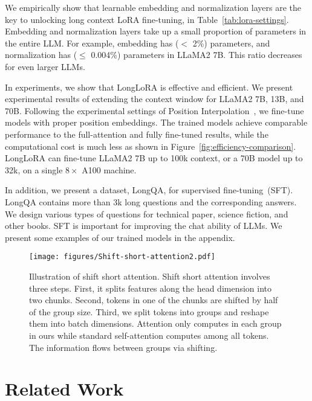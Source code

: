 \documentclass{article} %
\begin{document}
We empirically show that learnable embedding and normalization layers are the key to unlocking long context LoRA fine-tuning, in Table~\ref{tab:lora-settings}. Embedding and normalization layers take up a small proportion of parameters in the entire LLM. For example, embedding has ($<$ 2\%) parameters, and normalization has ($\leq$ 0.004\%) parameters in LLaMA2 7B. This ratio decreases for even larger LLMs.

In experiments, we show that LongLoRA is effective and efficient.
We present experimental results of extending the context window for LLaMA2 7B, 13B, and 70B. Following the experimental settings of Position Interpolation~\citep{position-interpolation}, we fine-tune models with proper position embeddings. The trained models achieve comparable performance to the full-attention and fully fine-tuned results, while the computational cost is much less as shown in Figure~\ref{fig:efficiency-comparison}. LongLoRA can fine-tune LLaMA2 7B up to 100k context, or a 70B model up to 32k, on a single $8\times$ A100 machine.

In addition, we present a dataset, LongQA, for supervised fine-tuning~(SFT). LongQA contains more than 3k long questions and the corresponding answers. We design various types of questions for technical paper, science fiction, and other books. SFT is important for improving the chat ability of LLMs. We present some examples of our trained models in the appendix.

\begin{figure*}[t]
\begin{center}
\texttt{[image: figures/Shift-short-attention2.pdf]}
\end{center}
\caption{Illustration of shift short attention. Shift short attention involves three steps. First, it splits features along the head dimension into two chunks. Second, tokens in one of the chunks are shifted by half of the group size. Third, we split tokens into groups and reshape them into batch dimensions. Attention only computes in each group in ours while standard self-attention computes among all tokens. The information flows between groups via shifting.}
\label{fig:shift-short-attention}
\end{figure*}

\section{Related Work}
\end{document}
